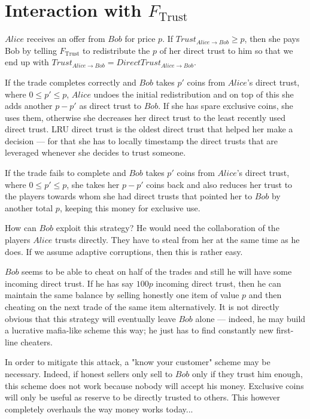 \section{Interaction with $F_{\mathrm{Trust}}$}
$Alice$ receives an offer from $Bob$ for price $p$. If $Trust_{Alice \rightarrow Bob} \geq
p$, then she pays Bob by telling $F_{\mathrm{Trust}}$ to redistribute the $p$ of her
direct trust to him so that we end up with $Trust_{Alice \rightarrow Bob} =
DirectTrust_{Alice \rightarrow Bob}$.

If the trade completes correctly and $Bob$ takes $p'$ coins from $Alice$'s direct trust,
where $0 \leq p' \leq p$, $Alice$ undoes the initial redistribution and on top of this she
adds another $p - p'$ as direct trust to $Bob$. If she has spare exclusive coins, she uses
them, otherwise she decreases her direct trust to the least recently used direct trust.
LRU direct trust is the oldest direct trust that helped her make a decision --- for that
she has to locally timestamp the direct trusts that are leveraged whenever she decides to
trust someone.

If the trade fails to complete and $Bob$ takes $p'$ coins from $Alice$'s direct trust,
where $0 \leq p' \leq p$, she takes her $p - p'$ coins back and also reduces her trust to
the players towards whom she had direct trusts that pointed her to $Bob$ by another total
$p$, keeping this money for exclusive use.

How can $Bob$ exploit this strategy? He would need the collaboration of the players
$Alice$ trusts directly. They have to steal from her at the same time as he does. If we
assume adaptive corruptions, then this is rather easy.

$Bob$ seems to be able to cheat on half of the trades and still he will have some incoming
direct trust. If he has say $100p$ incoming direct trust, then he can maintain the same
balance by selling honestly one item of value $p$ and then cheating on the next trade of
the same item alternatively. It is not directly obvious that this strategy will eventually
leave $Bob$ alone --- indeed, he may build a lucrative mafia-like scheme this way; he just
has to find constantly new first-line cheaters.

In order to mitigate this attack, a "know your customer" scheme may be necessary.  Indeed,
if honest sellers only sell to $Bob$ only if they trust him enough, this scheme does not
work because nobody will accept his money. Exclusive coins will only be useful as reserve
to be directly trusted to others. This however completely overhauls the way money works
today...
